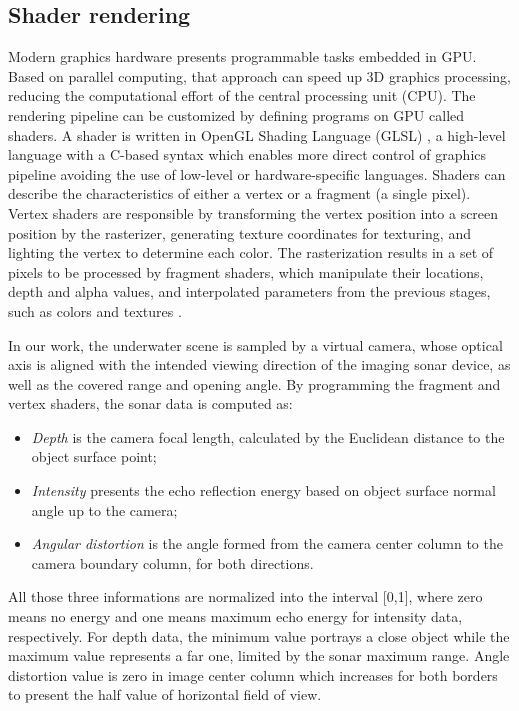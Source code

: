 \documentclass[final,5p,times]{elsarticle}
\begin{document}

\subsection{Shader rendering}
\label{dev:shader}

Modern graphics hardware presents programmable tasks embedded in GPU. Based on parallel computing, that approach can speed up 3D graphics processing, reducing the computational effort of the central processing unit (CPU). The rendering pipeline can be customized by defining programs on GPU called shaders. A shader is written in OpenGL Shading Language (GLSL) \cite{rost2009}, a high-level language with a C-based syntax which enables more direct control of graphics pipeline avoiding the use of low-level or hardware-specific languages. Shaders can describe the characteristics of either a vertex or a fragment (a single pixel). Vertex shaders are responsible by transforming the vertex position into a screen position by the rasterizer, generating texture coordinates for texturing, and lighting the vertex to determine each color. The rasterization results in a set of pixels to be processed by fragment shaders, which manipulate their locations, depth and alpha values, and interpolated parameters from the previous stages, such as colors and textures \cite{fernando2003}.

In our work, the underwater scene is sampled by a virtual camera, whose optical axis is aligned with the intended viewing direction of the imaging sonar device, as well as the covered range and opening angle. By programming the fragment and vertex shaders, the sonar data is computed as:

\begin{itemize}[(a)]
    \item \textit{Depth} is the camera focal length, calculated by the Euclidean distance to the object surface point;
    \item \textit{Intensity} presents the echo reflection energy based on object surface normal angle up to the camera;
    \item \textit{Angular distortion} is the angle formed from the camera center column to the camera boundary column, for both directions.
\end{itemize}

All those three informations are normalized into the interval [0,1], where zero means no energy and one means maximum echo energy for intensity data, respectively. For depth data, the minimum value portrays a close object while the maximum value represents a far one, limited by the sonar maximum range. Angle distortion value is zero in image center column which increases for both borders to present the half value of horizontal field of view.
\end{document}

